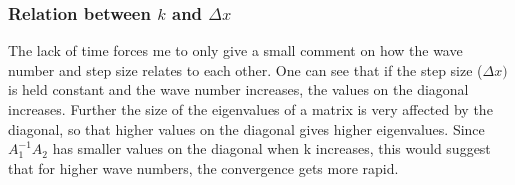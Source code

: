 \documentclass[12pt, a4paper,usenames,dvipsnames]{article}
\begin{document}
\subsubsection*{Relation between \(k\) and \(\Delta x\)}
The lack of time forces me to only give a small comment on how the wave number and step size relates to each other. One can see that if the step size (\(\Delta x)\) is held constant and the wave number increases, the values on the diagonal increases. Further the size of the eigenvalues of a matrix is very affected by the diagonal, so that higher values on the diagonal gives higher eigenvalues. Since \(A_1^{-1}A_2\) has smaller values on the diagonal when k increases, this would suggest that for higher wave numbers, the convergence gets more rapid.
\end{document}
